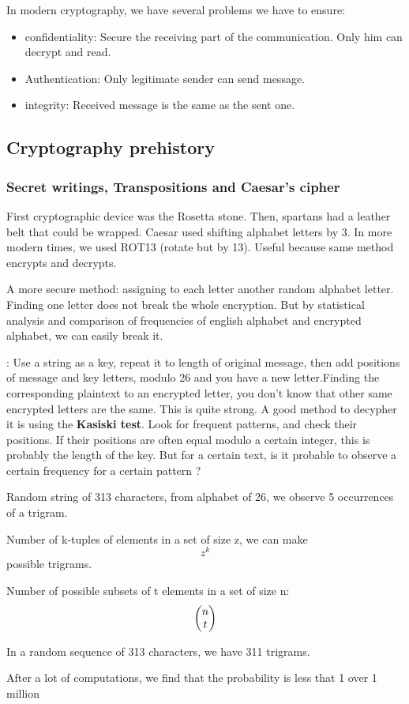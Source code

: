 \documentclass[11pt,a4paper]{article}
\begin{document}
In modern cryptography, we have several problems we have to ensure:

\begin{itemize}
    \item confidentiality: Secure the receiving part of the communication. Only him can decrypt and read.
    \item Authentication: Only legitimate sender can send message.
    \item integrity: Received message is the same as the sent one.
\end{itemize}

\subsection{Cryptography prehistory}
\subsubsection{Secret writings, Transpositions and Caesar's cipher}
First cryptographic device was the Rosetta stone. Then, spartans had a leather belt that could be wrapped. Caesar used shifting alphabet letters by 3. In more modern times, we used ROT13 (rotate but by 13). Useful because same method encrypts and decrypts.

A more secure method: assigning to each letter another random alphabet letter. Finding one letter does not break the whole encryption. But by statistical analysis and comparison of frequencies of english alphabet and encrypted alphabet, we can easily break it.

: Use a string as a key, repeat it to length of original message, then add positions of message and key letters, modulo 26 and you have a new letter.Finding the corresponding plaintext to an encrypted letter, you don't know that other same encrypted letters are the same. This is quite strong. A good method to decypher it is using the \textbf{Kasiski test}. Look for frequent patterns, and check their positions. If their positions are often equal modulo a certain integer, this is probably the length of the key. But for a certain text, is it probable to observe a certain frequency for a certain pattern ?

\begin{example}
    Random string of 313 characters, from alphabet of 26, we observe 5 occurrences of a trigram.

    Number of k-tuples of elements in a set of size z, we can make \[z^k\] possible trigrams.

    Number of possible subsets of t elements in a set of size n: \[\begin{pmatrix} n \\ t \end{pmatrix}\]

    In a random sequence of 313 characters, we have 311 trigrams.

    After a lot of computations, we find that the probability is less that 1 over 1 million
\end{example}
\end{document}

